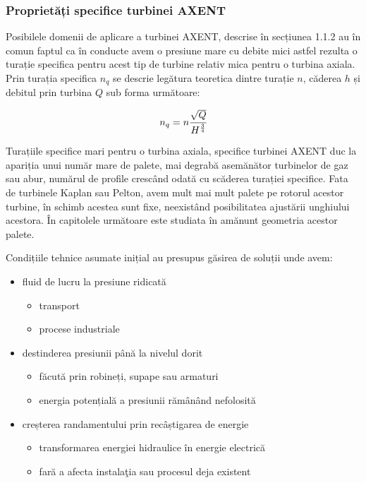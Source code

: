 \subsubsection{Proprietăți specifice turbinei AXENT}

Posibilele domenii de aplicare a turbinei AXENT, descrise în secțiunea 1.1.2 au în comun faptul ca în conducte avem o presiune mare cu debite mici astfel rezulta o turație specifica pentru acest tip de turbine relativ mica pentru o turbina axiala. Prin turația specifica \(n_q\) se descrie legătura teoretica dintre turație \(n\), căderea \(h\) și debitul prin turbina \(Q\) sub forma următoare:

\begin{equation}
n_q = n \cfrac{\sqrt{Q}}{H^\frac{3}{4}}
\end{equation}

Turațiile specifice mari pentru o turbina axiala, specifice turbinei AXENT duc la apariția unui număr mare de palete, mai degrabă asemănător turbinelor de gaz sau abur, numărul de profile crescând odată cu scăderea turației specifice. Fata de turbinele Kaplan sau Pelton, avem mult mai mult palete pe rotorul acestor turbine, în schimb acestea sunt fixe, neexistând posibilitatea ajustării unghiului acestora. În capitolele următoare este studiata în amănunt geometria acestor palete.

Condițiile tehnice asumate inițial au presupus găsirea de soluții unde avem:

\begin{itemize}
	\item fluid de lucru la presiune ridicat\u{a}
		\begin{itemize}
			\item transport
			\item procese industriale
		\end{itemize}
	\item destinderea presiunii p\^{a}n\u{a} la nivelul dorit
		\begin{itemize}
			\item făcută prin robineți, supape sau armaturi
			\item energia potențială a presiunii rămânând nefolosit\u{a}
		\end{itemize}
	\item creșterea randamentului prin recâștigarea de energie
		\begin{itemize}
			\item transformarea energiei hidraulice \^{i}n energie electric\u{a}
			\item far\u{a} a afecta instala\c{t}ia sau procesul deja existent
		\end{itemize}	
\end{itemize}

